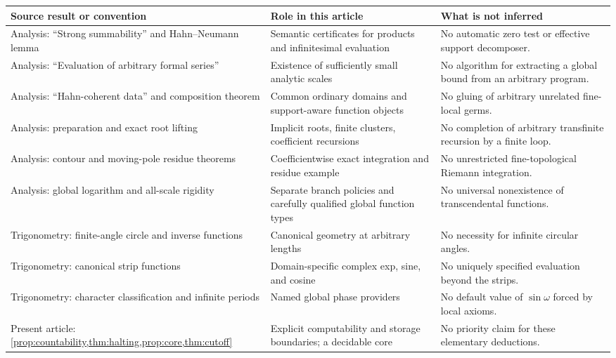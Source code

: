 \documentclass[11pt,letterpaper]{article}
\theoremstyle{definition}
\numberwithin{equation}{section}
\begin{document}
\begin{center}\small
\begin{longtable}{@{}L{0.27\textwidth}L{0.35\textwidth}L{0.29\textwidth}@{}}
\toprule
Source result or convention & Role in this article & What is not inferred\\\midrule\endhead
Analysis: ``Strong summability'' and Hahn--Neumann lemma & Semantic certificates for products and infinitesimal evaluation & No automatic zero test or effective support decomposer.\\[0.35em]
Analysis: ``Evaluation of arbitrary formal series'' & Existence of sufficiently small analytic scales & No algorithm for extracting a global bound from an arbitrary program.\\[0.35em]
Analysis: ``Hahn-coherent data'' and composition theorem & Common ordinary domains and support-aware function objects & No gluing of arbitrary unrelated fine-local germs.\\[0.35em]
Analysis: preparation and exact root lifting & Implicit roots, finite clusters, coefficient recursions & No completion of arbitrary transfinite recursion by a finite loop.\\[0.35em]
Analysis: contour and moving-pole residue theorems & Coefficientwise exact integration and residue example & No unrestricted fine-topological Riemann integration.\\[0.35em]
Analysis: global logarithm and all-scale rigidity & Separate branch policies and carefully qualified global function types & No universal nonexistence of transcendental functions.\\[0.35em]
Trigonometry: finite-angle circle and inverse functions & Canonical geometry at arbitrary lengths & No necessity for infinite circular angles.\\[0.35em]
Trigonometry: canonical strip functions & Domain-specific complex exp, sine, and cosine & No uniquely specified evaluation beyond the strips.\\[0.35em]
Trigonometry: character classification and infinite periods & Named global phase providers & No default value of $\sin\omega$ forced by local axioms.\\[0.35em]
Present article: \cref{prop:countability,thm:halting,prop:core,thm:cutoff} & Explicit computability and storage boundaries; a decidable core & No priority claim for these elementary deductions.\\
\bottomrule
\end{longtable}
\end{center}
\end{document}
